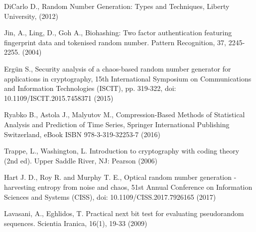\begin{thebibliography}{99.}
 DiCarlo D., Random Number Generation: Types and Techniques, Liberty University, (2012)

 Jin, A., Ling, D., Goh A., Biohashing: Two factor authentication featuring fingerprint data and tokenised random number. Pattern Recognition, 37, 2245- 2255. (2004)

 Ergün S., Security analysis of a chaos-based random number generator for applications in cryptography, 15th International Symposium on Communications and Information Technologies (ISCIT), pp. 319-322, doi: 10.1109/ISCIT.2015.7458371 (2015)

 Ryabko B., Astola J., Malyutov M., Compression-Based Methods of Statistical Analysis and Prediction of Time Series, Springer International Publishing Switzerland, eBook ISBN 978-3-319-32253-7 (2016)

 Trappe, L., Washington, L. Introduction to cryptography with coding theory (2nd ed). Upper Saddle River, NJ: Pearson (2006)

 Hart J. D., Roy R. and Murphy T. E., Optical random number generation - harvesting entropy from noise and chaos, 51st Annual Conference on Information Sciences and Systems (CISS), doi: 10.1109/CISS.2017.7926165 (2017)

 Lavasani, A., Eghlidos, T. Practical next bit test for evaluating pseudorandom sequences. Scientia Iranica, 16(1), 19-33 (2009)

\end{thebibliography}

